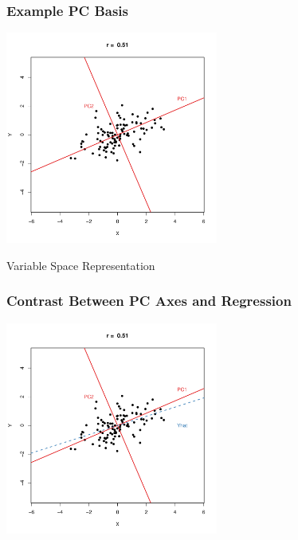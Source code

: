 \documentclass{beamer}
\begin{document}


\begin{frame}
  \frametitle{Example PC Basis}

\begin{center}
\includegraphics[height=2.75in]{fig-bivariate-pca.pdf}
\smallskip

Variable Space Representation

\end{center}  


\end{frame}

\begin{frame}
  \frametitle{Contrast Between PC Axes and Regression}

\begin{center}
\includegraphics[height=2.75in]{fig-bivariate-pca-wreg.pdf}
\smallskip

\end{center}  

\end{frame}
\end{document}
